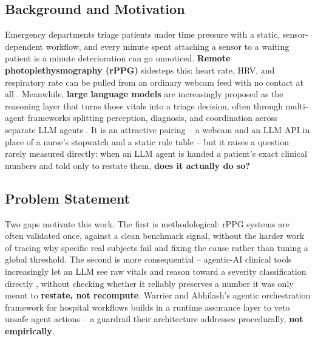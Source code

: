 \documentclass[conference]{IEEEtran}
\begin{document}
\subsection{\textbf{Background and Motivation}}
Emergency departments triage patients under time pressure with a static, sensor-dependent workflow, and every minute spent attaching a sensor to a waiting patient is a minute deterioration can go unnoticed. \textbf{Remote photoplethysmography (rPPG)} sidesteps this: heart rate, HRV, and respiratory rate can be pulled from an ordinary webcam feed with no contact at all \cite{b_chrom, b_pos_principles, b_pirzada_review}. Meanwhile, \textbf{large language models} are increasingly proposed as the reasoning layer that turns those vitals into a triage decision, often through multi-agent frameworks splitting perception, diagnosis, and coordination across separate LLM agents \cite{b_warrier_agentic, b_sharma_triagebot}. It is an attractive pairing -- a webcam and an LLM API in place of a nurse's stopwatch and a static rule table -- but it raises a question rarely measured directly: when an LLM agent is handed a patient's exact clinical numbers and told only to restate them, \textbf{does it actually do so?}

\subsection{\textbf{Problem Statement}}
Two gaps motivate this work. The first is methodological: rPPG systems are often validated once, against a clean benchmark signal, without the harder work of tracing why specific real subjects fail and fixing the cause rather than tuning a global threshold. The second is more consequential -- agentic-AI clinical tools increasingly let an LLM see raw vitals and reason toward a severity classification directly \cite{b_liu_tsai_cds}, without checking whether it reliably preserves a number it was only meant to \textbf{restate, not recompute}. Warrier and Abhilash's agentic orchestration framework for hospital workflows \cite{b_warrier_agentic} builds in a runtime assurance layer to veto unsafe agent actions -- a guardrail their architecture addresses procedurally, \textbf{not empirically}.
\end{document}
